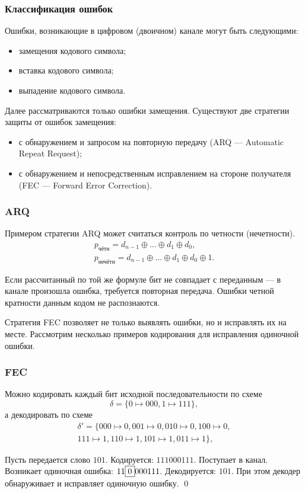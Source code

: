 \begin{frame}
    \frametitle{Классификация ошибок}
    
    Ошибки, возникающие в цифровом (двоичном) канале могут быть следующими:
    \begin{itemize}
        \item замещения кодового символа;
        \item вставка кодового символа;
        \item выпадение кодового символа.
    \end{itemize}
    
    Далее рассматриваются только ошибки замещения. Существуют две стратегии защиты от ошибок замещения:
    \begin{itemize}
        \item с обнаружением и запросом на повторную передачу (ARQ --- Automatic Repeat Request);
        \item с обнаружением и непосредственным исправлением на стороне получателя (FEC --- Forward Error Correction).
    \end{itemize}
\end{frame}

\begin{frame}
    \frametitle{ARQ}
    
    Примером стратегии ARQ может считаться контроль по четности (нечетности). 
    \[
        \begin{split}
            p_{\text{чётн}}=d_{n-1}\oplus\ldots\oplus d_1\oplus d_0,\\
            p_{\text{нечётн}}=d_{n-1}\oplus\ldots\oplus d_1\oplus d_0\oplus 1.
        \end{split}
    \]
\end{frame}

Если рассчитанный по той же формуле бит не совпадает с переданным --- в канале произошла ошибка, требуется повторная передача. Ошибки четной кратности данным кодом не распознаются.

Стратегия FEC позволяет не только выявлять ошибки, но и исправлять их на месте. Рассмотрим несколько примеров кодирования для исправления одиночной ошибки.

\begin{frame}
    \frametitle{FEC}
    
    Можно кодировать каждый бит исходной последовательности по схеме
    \[\delta=\{0\mapsto 000, 1\mapsto 111\},\]
    а декодировать по схеме
    \[
        \begin{split}
            \delta'=\{
                000\mapsto 0,001\mapsto 0,010\mapsto 0,100\mapsto 0,\\
                111\mapsto 1,110\mapsto 1,101\mapsto 1,011\mapsto 1
            \},
        \end{split}
    \]
    \begin{example}
        Пусть передается слово $101$. Кодируется: $111000111$. Поступает в канал. Возникает одиночная ошибка: $11\fbox{$0$}000111$. Декодируется: $101$. При этом декодер обнаруживает и исправляет одиночную ошибку. \qed
    \end{example}
\end{frame}


